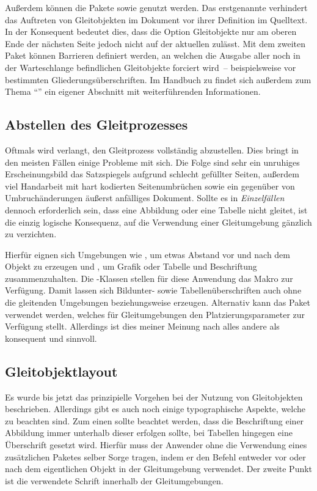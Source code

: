 \documentclass[%
  english,ngerman,%
  geometry=no,DIV=12,automark,%
]{tudscrartcl}
\begin{document}
Außerdem können die Pakete  sowie  genutzt 
werden. Das erstgenannte verhindert das Auftreten von Gleitobjekten im Dokument 
vor ihrer Definition im Quelltext. In der Konsequent bedeutet dies, dass die 
Option  Gleitobjekte nur am oberen Ende der nächsten Seite 
jedoch nicht auf der aktuellen zulässt. Mit dem zweiten Paket können Barrieren 
definiert werden, an welchen die Ausgabe aller noch in der Warteschlange 
befindlichen Gleitobjekte forciert wird~-- beispielsweise vor bestimmten 
Gliederungsüberschriften. Im Handbuch zu \TUDScript findet sich außerdem zum 
Thema \enquote{} 
ein eigener Abschnitt mit weiterführenden Informationen.


\subsection{Abstellen des Gleitprozesses}
Oftmals wird verlangt, den Gleitprozess vollständig abzustellen. Dies bringt in 
den meisten Fällen einige Probleme mit sich. Die Folge sind sehr ein unruhiges 
Erscheinungsbild das Satzspiegels aufgrund schlecht gefüllter Seiten, außerdem 
viel Handarbeit mit hart kodierten Seitenumbrüchen sowie ein gegenüber von 
Umbruchänderungen äußerst anfälliges Dokument. Sollte es in \emph{Einzelfällen} 
dennoch erforderlich sein, dass eine Abbildung oder eine Tabelle nicht gleitet, 
ist die einzig logische Konsequenz, auf die Verwendung einer Gleitumgebung 
gänzlich zu verzichten. 

Hierfür eignen sich Umgebungen wie , um etwas Abstand vor 
und nach dem Objekt zu erzeugen und , um Grafik oder 
Tabelle und Beschriftung zusammenzuhalten. Die \KOMAScript-Klassen stellen für 
diese Anwendung das Makro  zur Verfügung. Damit lassen sich 
Bildunter- sowie Tabellenüberschriften auch ohne die gleitenden Umgebungen 
 beziehungsweise  erzeugen. Alternativ 
kann das Paket  verwendet werden, welches für Gleitumgebungen 
den Platzierungsparameter  zur Verfügung stellt. Allerdings ist 
dies meiner Meinung nach alles andere als konsequent und sinnvoll.


\subsection{Gleitobjektlayout}
\label{sec:floatlayout}
%
Es wurde bis jetzt das prinzipielle Vorgehen bei der Nutzung von Gleitobjekten 
beschrieben. Allerdings gibt es auch noch einige typographische Aspekte, welche 
zu beachten sind. Zum einen sollte beachtet werden, dass die Beschriftung einer 
Abbildung immer unterhalb dieser erfolgen sollte, bei Tabellen hingegen eine 
Überschrift gesetzt wird. Hierfür muss der Anwender ohne die Verwendung eines 
zusätzlichen Paketes selber Sorge tragen, indem er den Befehl  
entweder vor oder nach dem eigentlichen Objekt in der Gleitumgebung verwendet. 
Der zweite Punkt ist die verwendete Schrift innerhalb der Gleitumgebungen. 
\end{document}
